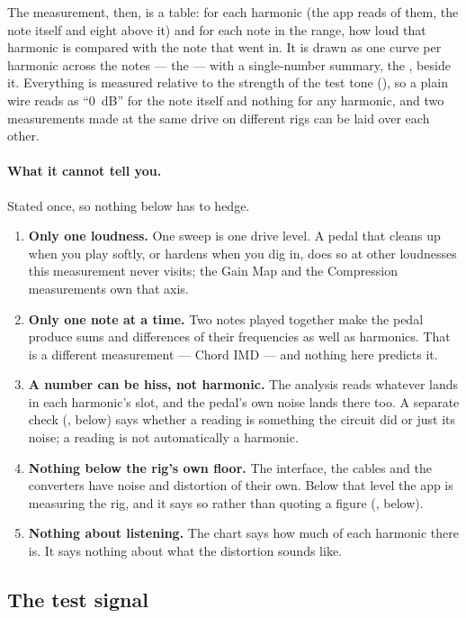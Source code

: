 \documentclass[11pt,a4paper]{article}
\begin{document}
The measurement, then, is a table: for each harmonic (the app reads
\hdHarmonicCount{} of them, the note itself and eight above it) and for
each note in the range, how loud that harmonic is compared with the note
that went in. It is drawn as one curve per harmonic across the notes ---
the  --- with a single-number summary, the
, beside it. Everything is measured relative to the strength of
the test tone (), so a plain wire reads as
``0~dB'' for the note itself and nothing for any harmonic, and two
measurements made at the same drive on different rigs can be laid over
each other.

\paragraph{What it cannot tell you.} Stated once, so nothing below has
to hedge.
\begin{enumerate}
  \item \textbf{Only one loudness.} One sweep is one drive level. A pedal
  that cleans up when you play softly, or hardens when you dig in, does
  so at other loudnesses this measurement never visits; the Gain Map and
  the Compression measurements own that axis.
  \item \textbf{Only one note at a time.} Two notes played together make
  the pedal produce sums and differences of their frequencies as well as
  harmonics. That is a different measurement --- Chord IMD --- and
  nothing here predicts it.
  \item \textbf{A number can be hiss, not harmonic.} The analysis reads
  whatever lands in each harmonic's slot, and the pedal's own noise lands
  there too. A separate check (, below) says whether a
  reading is something the circuit did or just its noise; a reading is
  not automatically a harmonic.
  \item \textbf{Nothing below the rig's own floor.} The interface, the
  cables and the converters have noise and distortion of their own. Below
  that level the app is measuring the rig, and it says so rather than
  quoting a figure (, below).
  \item \textbf{Nothing about listening.} The chart says how much of each
  harmonic there is. It says nothing about what the distortion sounds like.
\end{enumerate}

\subsection{The test signal}
\end{document}
